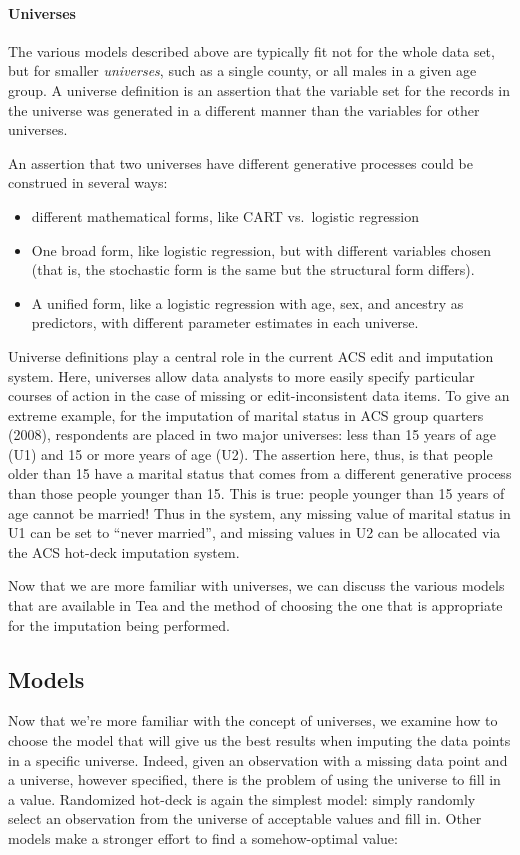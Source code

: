 \documentclass{article}
\def\tighten{ \setlength{\itemsep}{1pt}
    \setlength{\parskip}{0pt}}
\begin{document}
\paragraph{Universes}
The various models described above are typically fit not for the whole data set, but for
smaller {\em universes}, such as a single county, or all males in a given age group.
A universe definition is an assertion that the variable set for the records in the
universe was generated in a different manner than the variables for other universes.

An assertion that two universes have different generative processes could be construed in
several ways:

\begin{itemize}\tighten
\item different mathematical forms, like CART vs.\ logistic regression
\item One broad form, like logistic regression, but with different variables chosen
    (that is, the stochastic form is the same but the structural form differs).
\item A unified form, like a logistic regression with age, sex, and ancestry
    as predictors, with different parameter estimates in each universe.
\end{itemize}

Universe definitions play a central role in the current ACS edit and imputation system.
Here, universes allow data analysts to more easily specify particular courses of
action in the case of missing or edit-inconsistent data items. To give an extreme example, for the imputation of marital status in ACS group quarters (2008), respondents are placed
in two major universes: less than 15 years of age (U1) and 15 or more years of age
(U2). The assertion here, thus, is that people older than 15 have a marital status
that comes from a different generative process than those people younger than 15.
This is true: people younger than 15 years of age cannot be married!  Thus in the
system, any missing value of marital status in U1 can be set to ``never married'',
and missing values in U2 can be allocated via the ACS hot-deck imputation system.

Now that we are more familiar with universes, we can discuss the various models that are 
available in Tea and the method of choosing the one that is appropriate for the 
imputation being performed.


\subsection{Models}
Now that we're more familiar with the concept of universes, we examine how to choose the 
model that will give us the best results when imputing the data points in a specific universe.
Indeed, given an observation with a missing data point and a universe, however specified, there is
the problem of using the universe to fill in a value. Randomized hot-deck is again
the simplest model: simply randomly select an observation from the universe of acceptable
values and fill in. Other models make a stronger effort to find a somehow-optimal value:\\
\end{document}
